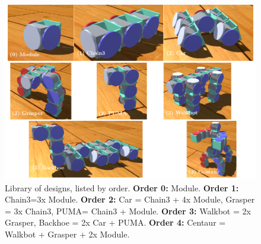 \documentclass[graybox]{svmult}
\begin{document}
\begin{figure}
  \begin{center}
    \includegraphics[width=\textwidth]{images/library/bigGrid.pdf}
    \caption{Library of designs, listed by order. 
    \textbf{Order 0:} Module. \textbf{Order 1:} Chain3=3x Module.
    \textbf{Order 2:} Car = Chain3 + 4x Module, Grasper = 3x Chain3, PUMA= Chain3 + Module.
    \textbf{Order 3:} Walkbot = 2x Grasper, Backhoe = 2x Car + PUMA.
    \textbf{Order 4:} Centaur = Walkbot + Grasper + 2x Module.}
    \label{fig:library}
  \end{center}
\end{figure}


\end{document}
